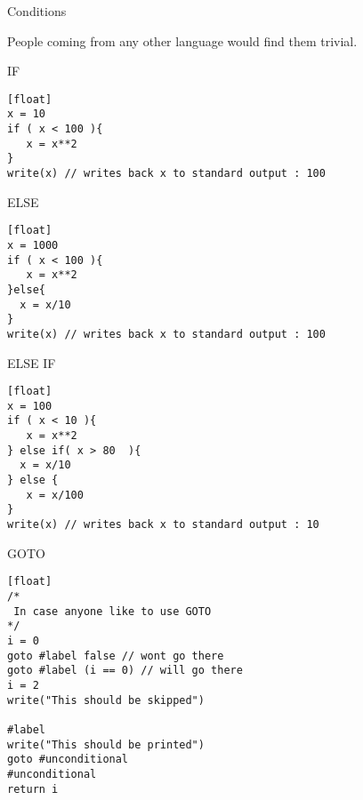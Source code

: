 \begin{section}{Conditions}

People coming from any other language would find them trivial.

\begin{subsection}{IF}

\begin{lstlisting}[style=JexlStyle][float]
x = 10 
if ( x < 100 ){
   x = x**2
}
write(x) // writes back x to standard output : 100
\end{lstlisting}
\end{subsection}

\begin{subsection}{ELSE}
\begin{lstlisting}[style=JexlStyle][float]
x = 1000 
if ( x < 100 ){
   x = x**2
}else{
  x = x/10 
}
write(x) // writes back x to standard output : 100
\end{lstlisting}
\end{subsection}

\begin{subsection}{ELSE IF}
\begin{lstlisting}[style=JexlStyle][float]
x = 100 
if ( x < 10 ){
   x = x**2
} else if( x > 80  ){
  x = x/10 
} else {
   x = x/100 
}
write(x) // writes back x to standard output : 10
\end{lstlisting}
\end{subsection}

\begin{subsection}{GOTO}
\begin{lstlisting}[style=JexlStyle][float]
/* 
 In case anyone like to use GOTO
*/
i = 0 
goto #label false // wont go there 
goto #label (i == 0) // will go there 
i = 2 
write("This should be skipped")

#label
write("This should be printed")
goto #unconditional
#unconditional
return i 
\end{lstlisting}
\end{subsection}
\end{section}

